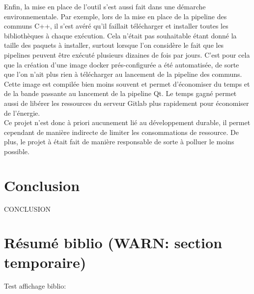 \documentclass[a4paper]{article}
\begin{document}
Enfin, la mise en place de l'outil s'est aussi fait dans une démarche
environnementale. Par exemple, lors de la mise en place de la pipeline des
communs C++, il s'est avéré qu'il faillait télécharger et installer toutes les
bibliothèques à chaque exécution. Cela n'était pas souhaitable étant donné la
taille des paquets à installer, surtout lorsque l'on considère le fait que les
pipelines peuvent être exécuté plusieurs dizaines de fois par jours. C'est pour
cela que la création d'une image docker prés-configurée a été automatisée, de
sorte que l'on n'ait plus rien à télécharger au lancement de la pipeline des
communs. Cette image est compilée bien moins souvent et permet d'économiser du
temps et de la bande passante au lancement de la pipeline Qt. Le temps gagné
permet aussi de libérer les ressources du serveur Gitlab plus rapidement pour
économiser de l'énergie.\\

Ce projet n'est donc à priori aucunement lié au développement durable, il permet
cependant de manière indirecte de limiter les consommations de ressource. De
plus, le projet à était fait de manière responsable de sorte à polluer le moins
possible.

\clearpage
\section*{Conclusion}

CONCLUSION



\section{Résumé biblio (WARN: section temporaire)}

Test affichage biblio:
\end{document}
